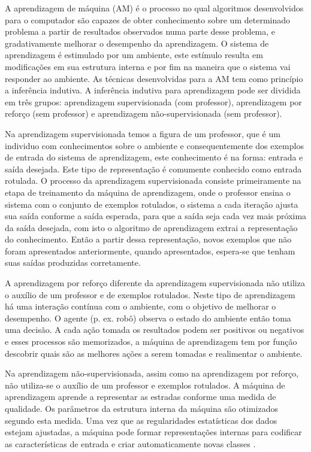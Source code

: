 A aprendizagem de máquina (AM) é o processo no qual algoritmos desenvolvidos para o computador são capazes de obter conhecimento sobre um determinado problema a partir de resultados observados numa parte desse problema, e gradativamente melhorar o desempenho da aprendizagem. O sistema de aprendizagem é estimulado por um ambiente, este estímulo resulta em modificações em sua estrutura interna e por fim na maneira que o sistema vai responder ao ambiente. As técnicas desenvolvidas para a AM tem como princípio a inferência indutiva. A inferência indutiva para aprendizagem pode ser dividida em três grupos: aprendizagem supervisionada (com professor), aprendizagem por reforço (sem professor)  e aprendizagem não-supervisionada (sem professor).

Na aprendizagem supervisionada temos a figura de um professor, que é um individuo com conhecimentos sobre o ambiente e consequentemente dos exemplos de entrada do sistema de aprendizagem, este conhecimento é na forma: entrada e saída desejada. Este tipo de representação é comumente conhecido como entrada rotulada. O processo da aprendizagem supervisionada consiste primeiramente na etapa de treinamento da máquina de aprendizagem, onde o professor ensina o sistema com o conjunto de exemplos rotulados, o sistema a cada iteração ajusta sua saída conforme a saída esperada, para que a saída seja cada vez mais próxima da saída desejada, com isto o algoritmo de aprendizagem extrai a representação do conhecimento. Então a partir dessa representação, novos exemplos que não foram apresentados anteriormente, quando apresentados, espera-se que tenham suas saídas produzidas corretamente.

A aprendizagem por reforço diferente da aprendizagem supervisionada não utiliza o auxílio de um professor e de exemplos rotulados. Neste tipo de aprendizagem há uma interação contínua com o ambiente, com o objetivo de melhorar o desempenho. O agente (p. ex. robô) observa o estado do ambiente então toma uma decisão. A cada ação tomada os resultados podem ser positivos ou negativos e esses processos são memorizados, a máquina de aprendizagem tem por função descobrir quais são as melhores ações a serem tomadas e realimentar o ambiente.

Na aprendizagem não-supervisionada, assim como na aprendizagem por reforço, não utiliza-se o auxílio de um professor e exemplos rotulados. A máquina de aprendizagem aprende a representar as estradas conforme uma medida de qualidade. Os parâmetros da estrutura interna da máquina são otimizados segundo esta medida. Uma vez que as regularidades estatísticas dos dados estejam ajustadas, a máquina pode formar representações internas para codificar as características de entrada e criar automaticamente novas classes \cite{Haykin99}.


